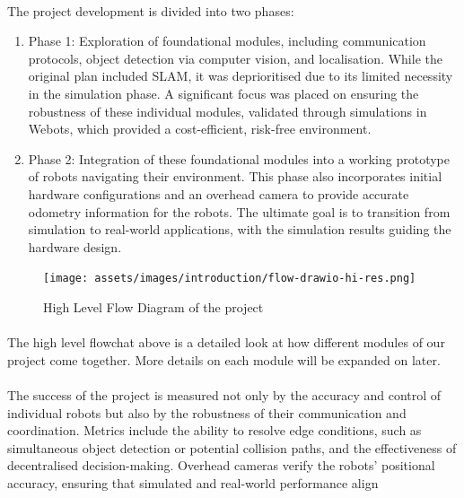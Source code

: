 \paragraph*{}
The project development is divided into two phases:

\begin{enumerate}
    \item Phase 1: Exploration of foundational modules, including communication protocols, object detection via computer vision, and localisation. While the original plan included SLAM, it was deprioritised due to its limited necessity in the simulation phase.  A significant focus was placed on ensuring the robustness of these individual modules, validated through simulations in Webots, which provided a cost-efficient, risk-free environment.
    \item Phase 2: Integration of these foundational modules into a working prototype of robots navigating their environment. This phase also incorporates initial hardware configurations and an overhead camera to provide accurate odometry information for the robots. The ultimate goal is to transition from simulation to real-world applications, with the simulation results guiding the hardware design.
\end{enumerate}

\begin{figure} [H]
    \centering    
    \hspace*{-10cm} %
    \vspace*{-0.8cm} %
    
    \texttt{[image: assets/images/introduction/flow-drawio-hi-res.png]}
    \caption{High Level Flow Diagram of the project}
    \label{fig:high-level-flow}
\end{figure}



\paragraph*{}
The high level flowchat above is a detailed look at how different modules of our project come together. More details on each module will be expanded on later.
\paragraph*{}
The success of the project is measured not only by the accuracy and control of individual robots but also by the robustness of their communication and coordination. Metrics include the ability to resolve edge conditions, such as simultaneous object detection or potential collision paths, and the effectiveness of decentralised decision-making. Overhead cameras verify the robots’ positional accuracy, ensuring that simulated and real-world performance align

